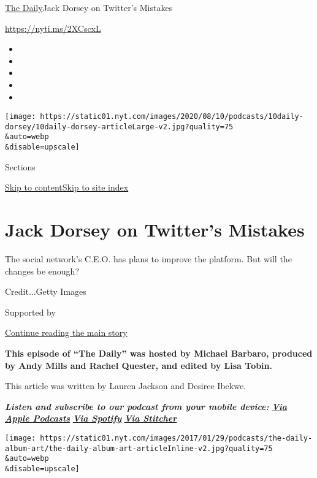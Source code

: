 \href{/podcasts/the-daily}{The Daily}\textbar{}Jack Dorsey on Twitter's
Mistakes

\href{https://nyti.ms/2XCscxL}{https://nyti.ms/2XCscxL}

\begin{itemize}
\item
\item
\item
\item
\item
\end{itemize}

\texttt{[image: https://static01.nyt.com/images/2020/08/10/podcasts/10daily-dorsey/10daily-dorsey-articleLarge-v2.jpg?quality=75\\\&auto=webp\\\&disable=upscale]}

Sections

\protect\hyperlink{site-content}{Skip to
content}\protect\hyperlink{site-index}{Skip to site index}

\hypertarget{jack-dorsey-on-twitters-mistakes}{%
\section{Jack Dorsey on Twitter's
Mistakes}\label{jack-dorsey-on-twitters-mistakes}}

The social network's C.E.O. has plans to improve the platform. But will
the changes be enough?

Credit...Getty Images

Supported by

\protect\hyperlink{after-sponsor}{Continue reading the main story}

\textbf{This episode of ``The Daily'' was hosted by Michael Barbaro,
produced by Andy Mills and Rachel Quester, and edited by Lisa Tobin.}

This article was written by Lauren Jackson and Desiree Ibekwe.

\emph{\textbf{Listen and subscribe to our podcast from your mobile
device:}}
\textbf{\href{https://itunes.apple.com/us/podcast/the-daily/id1200361736?mt=2}{\emph{Via
Apple Podcasts}}} \emph{\textbf{\textbar{}}}
\textbf{\href{https://open.spotify.com/show/3IM0lmZxpFAY7CwMuv9H4g?si=SfuMSC55R1qprFsRZU3_zw}{\emph{Via
Spotify}}} \emph{\textbf{\textbar{}}}
\textbf{\href{http://www.stitcher.com/podcast/the-new-york-times/the-daily-10}{\emph{Via
Stitcher}}}

\texttt{[image: https://static01.nyt.com/images/2017/01/29/podcasts/the-daily-album-art/the-daily-album-art-articleInline-v2.jpg?quality=75\\\&auto=webp\\\&disable=upscale]}

